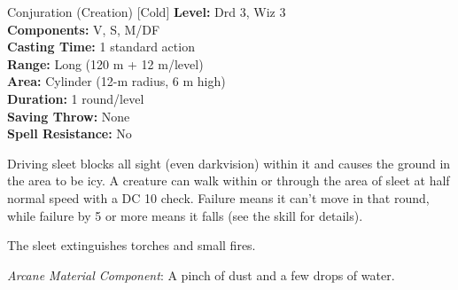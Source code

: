 {Conjuration (Creation) [Cold]}
{
	\textbf{Level:}
	Drd 3, Wiz 3\\
	\textbf{Components:}
	V, S, M/DF\\
	\textbf{Casting Time:}
	1 standard action\\
	\textbf{Range:}
	Long (120 m + 12 m/level)\\
	\textbf{Area:}
	Cylinder (12-m radius, 6 m high)\\
	\textbf{Duration:}
	1 round/level\\
	\textbf{Saving Throw:}
	None\\
	\textbf{Spell Resistance:}
	No\\
}
{
	Driving sleet blocks all sight (even darkvision) within it and causes the ground in the area to be icy. A creature can walk within or through the area of sleet at half normal speed with a DC 10  check. Failure means it can't move in that round, while failure by 5 or more means it falls (see the  skill for details).

	The sleet extinguishes torches and small fires.

	\textit{Arcane Material Component}:
	A pinch of dust and a few drops of water.

}
